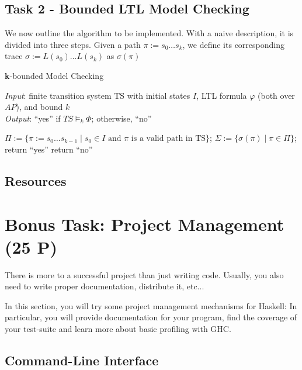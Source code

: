 \documentclass{article}
\begin{document}
\subsection*{Task 2 - Bounded LTL Model Checking}
We now outline the algorithm to be implemented. With a naive description, it is divided into three steps. Given a path $\pi := s_0 \dots s_k$, we define its corresponding trace $\sigma := L(s_0) \dots L(s_k)$ as $\sigma(\pi)$
\color{black}
\begin{algorithm}[H]
    \caption{\textbf{k}-bounded  Model Checking}
    \hspace*{\algorithmicindent} \emph{Input}: finite transition system TS with initial states $I$, LTL formula $\varphi$ (both over $AP$), and bound $k$ \\
    \hspace*{\algorithmicindent} \emph{Output}: ``yes'' if $TS \vDash_k \Phi$; otherwise, ``no''
    \begin{algorithmic}
    \State $\Pi := \{ \pi := s_0 \dots s_{k-1} \mid s_0 \in I \text{ and } \pi \text{ is a valid path in TS} \}  $;
    \State $\Sigma := \{ \sigma(\pi) \mid  \pi \in \Pi \}$;
        \State return ``yes''
    \Else 
        \State return ``no''
    \EndIf
    \end{algorithmic}
\end{algorithm}


\subsection*{Resources}
\cite[Paragraph 5.1 (in particular 5.1.1 and 5.1.2)]{BaKa}

\section{Bonus Task: Project Management (25 P)}
\label{sec-bonus}

There is more to a successful project than just writing code. 
Usually, you also need to write proper documentation, distribute it, etc...

In this section, you will try some project management mechanisms for Haskell: 
In particular, you will provide documentation for your program, 
find the coverage of your test-suite and learn more about basic profiling with GHC.

\subsection{Command-Line Interface}
\end{document}
